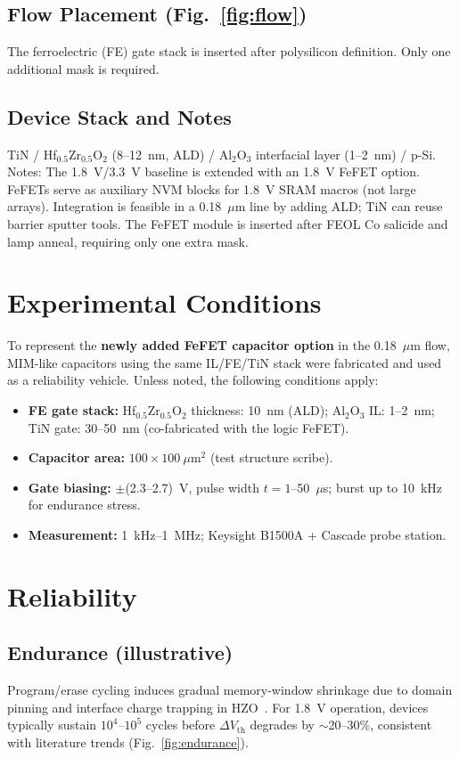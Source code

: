 \documentclass[conference]{IEEEtran}
\begin{document}
\subsection{Flow Placement (Fig.~\ref{fig:flow})}
The ferroelectric (FE) gate stack is inserted after polysilicon definition. Only one additional mask is required.

\subsection{Device Stack and Notes}
TiN / Hf$_{0.5}$Zr$_{0.5}$O$_2$ (8--12~nm, ALD) / Al$_2$O$_3$ interfacial layer (1--2~nm) / p-Si. Notes: The 1.8~V/3.3~V baseline is extended with an 1.8~V FeFET option. FeFETs serve as auxiliary NVM blocks for 1.8~V SRAM macros (not large arrays). Integration is feasible in a 0.18~$\mu$m line by adding ALD; TiN can reuse barrier sputter tools. The FeFET module is inserted after FEOL Co salicide and lamp anneal, requiring only one extra mask.

\section{Experimental Conditions}
To represent the \textbf{newly added FeFET capacitor option} in the 0.18~$\mu$m flow, MIM-like capacitors using the same IL/FE/TiN stack were fabricated and used as a reliability vehicle. Unless noted, the following conditions apply:
\begin{itemize}
  \item \textbf{FE gate stack:} Hf$_{0.5}$Zr$_{0.5}$O$_2$ thickness: 10~nm (ALD); Al$_2$O$_3$ IL: 1--2~nm; TiN gate: 30--50~nm (co-fabricated with the logic FeFET).
  \item \textbf{Capacitor area:} $100 \times 100~\mu$m$^2$ (test structure scribe).
  \item \textbf{Gate biasing:} $\pm$(2.3--2.7)~V, pulse width $t = 1$--50~$\mu$s; burst up to 10~kHz for endurance stress.
  \item \textbf{Measurement:} 1~kHz--1~MHz; Keysight B1500A + Cascade probe station.
\end{itemize}

\section{Reliability}

\subsection{Endurance (illustrative)}
Program/erase cycling induces gradual memory-window shrinkage due to domain pinning and interface charge trapping in HZO~\cite{Boscke2011,Mueller2012}. For 1.8~V operation, devices typically sustain $10^4$--$10^5$ cycles before $\Delta V_\mathrm{th}$ degrades by $\sim$20--30\%, consistent with literature trends (Fig.~\ref{fig:endurance}).
\end{document}
